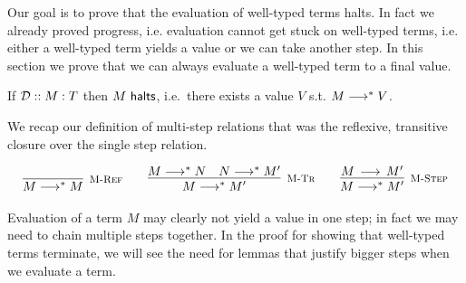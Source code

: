 Our goal is to prove that the evaluation of well-typed terms halts. In
fact we already proved progress, i.e. evaluation cannot get stuck on
well-typed terms, i.e. either a well-typed term yields a value or we
can take another step. In this section we prove that we can always
evaluate a well-typed term to a final value.

\begin{theorem}
If $\mathbin{{\mathcal{D}} :: M : T }$ then $M ~\mathsf{halts}$, i.e.~there exists a value $V$ s.t. $M
\longrightarrow^* V$.
\end{theorem}

We recap our definition of multi-step relations that was the
reflexive, transitive closure over the single step relation.

\[
\begin{array}{c@{\qquad}c@{\qquad}c}
\infer[\MRef]{M \MSteps M}{} &
\infer[\MTr]{M \MSteps M'}{M \MSteps N & N \MSteps M'} &
\infer[\MStep]{M \MSteps M'}{M \Steps M'}
\end{array}
\]

Evaluation of a term $M$ may clearly not yield a value in one step; in fact we may need to chain multiple steps together.
In the proof for showing that well-typed terms terminate, we will see the need for lemmas that justify bigger steps when we evaluate a term.

